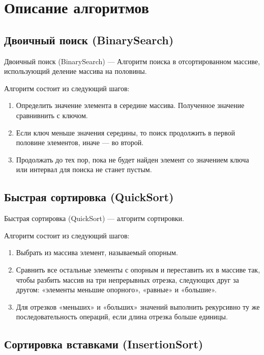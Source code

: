 \section*{Описание алгоритмов}

\subsection*{Двоичный поиск (BinarySearch)}

Двоичный поиск (BinarySearch) --- Алгоритм поиска в отсортированном массиве, использующий деление массива на половины.

Алгоритм состоит из следующий шагов:

\begin{enumerate}
    \item Определить значение элемента в середине массива. 
    Полученное значение сравнивнить с ключом.
    \item Если ключ меньше значения середины, 
    то поиск продолжить в первой половине элементов, иначе — во второй.
    \item Продолжать до тех пор, пока не будет найден элемент со значением ключа 
    или интервал для поиска не станет пустым.   
\end{enumerate}

\subsection*{Быстрая сортировка (QuickSort)}

Быстрая сортировка (QuickSort) --- алгоритм сортировки.

Алгоритм состоит из следующий шагов:

\begin{enumerate}
    \item Выбрать из массива элемент, называемый опорным.
    \item Сравнить все остальные элементы с опорным и переставить их в массиве так, 
    чтобы разбить массив на три непрерывных отрезка, 
    следующих друг за другом: «элементы меньшие опорного», «равные» и «большие».
    \item Для отрезков «меньших» и «больших» значений выполнить рекурсивно ту же последовательность операций, 
    если длина отрезка больше единицы.
\end{enumerate}

\subsection*{Сортировка вставками (InsertionSort)}

